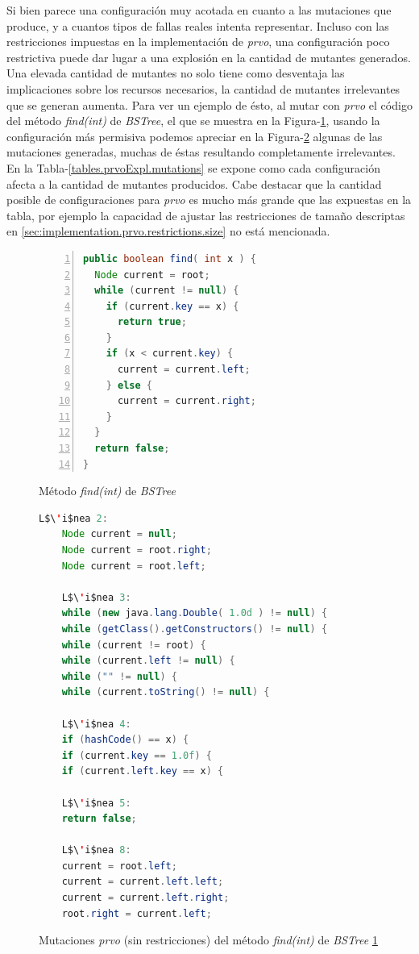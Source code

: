 Si bien parece una configuraci\'on muy acotada en cuanto a las mutaciones que produce, y a cuantos tipos de fallas reales intenta representar. Incluso con las restricciones impuestas en la implementaci\'on de \emph{prvo}, una configuraci\'on poco restrictiva puede dar lugar a una explosi\'on en la cantidad de mutantes generados. Una elevada cantidad de mutantes no solo tiene como desventaja las implicaciones sobre los recursos necesarios, la cantidad de mutantes irrelevantes que se generan aumenta. Para ver un ejemplo de \'esto, al mutar con \emph{prvo} el c\'odigo del m\'etodo \emph{find(int)} de \emph{BSTree}, el que se muestra en la Figura-\ref{figures.examples.prvoExpl.findMethod}, usando la configuraci\'on m\'as permisiva podemos apreciar en la Figura-\ref{figures.examples.prvoExpl.mutations} algunas de las mutaciones generadas, muchas de \'estas resultando completamente irrelevantes. En la Tabla-\ref{tables.prvoExpl.mutations} se expone como cada configuraci\'on afecta a la cantidad de mutantes producidos. Cabe destacar que la cantidad posible de configuraciones para \emph{prvo} es mucho m\'as grande que las expuestas en la tabla, por ejemplo la capacidad de ajustar las restricciones de tama\~no descriptas en \ref{sec:implementation.prvo.restrictions.size} no est\'a mencionada.

\begin{figure}
	\begin{lstlisting}[frame=single, numbers=left, mathescape=true,language=Java]
public boolean find( int x ) {
  Node current = root;
  while (current != null) {
    if (current.key == x) {
      return true;
    }
    if (x < current.key) {
      current = current.left;
    } else {
      current = current.right;
    }
  }
  return false;
}
	\end{lstlisting}
	\caption{M\'etodo \emph{find(int)} de \emph{BSTree}}
	\label{figures.examples.prvoExpl.findMethod}
\end{figure}

\begin{figure}
	\begin{lstlisting}[mathescape=true,language=Java]
	L$\'i$nea 2:
	Node current = null;
	Node current = root.right;
	Node current = root.left;
	
	L$\'i$nea 3:
	while (new java.lang.Double( 1.0d ) != null) {
	while (getClass().getConstructors() != null) {
	while (current != root) {
	while (current.left != null) {
	while ("" != null) {
	while (current.toString() != null) {
	
	L$\'i$nea 4:
	if (hashCode() == x) {
	if (current.key == 1.0f) {
	if (current.left.key == x) {
	
	L$\'i$nea 5:
	return false;
	
	L$\'i$nea 8:
	current = root.left;
	current = current.left.left;
	current = current.left.right;
	root.right = current.left;
	\end{lstlisting}
	\caption{Mutaciones \emph{prvo} (sin restricciones) del m\'etodo \emph{find(int)} de \emph{BSTree} \ref{figures.examples.prvoExpl.findMethod}}
	\label{figures.examples.prvoExpl.mutations}
\end{figure}

